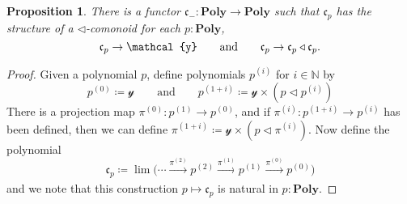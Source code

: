 \documentclass[11pt, one side, article]{memoir}
\theoremstyle{definition}
\theoremstyle{plain}
\newtheorem{proposition}[definitionx]{Proposition}
\newcommand{\Cat}[1]{\mathbf{#1}}%
\newcommand{\To}[2][]{\xrightarrow[#1]{#2}}
\newcommand{\nn}{\mathbb{N}}
\newcommand{\yon}{\mathcal{y}}
\newcommand{\poly}{\Cat{Poly}}
\newcommand{\tri}{\mathbin{\triangleleft}}
\newcommand{\cofree}{\mathfrak{c}}
\newcommand{\qqand}{\qquad\text{and}\qquad}
\newcommand{\coh}[1]{^{(#1)}}
\begin{document}
\begin{proposition}
There is a functor $\cofree_-\colon\poly\to\poly$ such that $\cofree_p$ has the structure of a $\tri$-comonoid for each $p:\poly$,
\[
\cofree_p\to\yon
\qqand
\cofree_p\to\cofree_p\tri\cofree_p.
\qedhere
\]
\end{proposition}
\begin{proof}
Given a polynomial $p$, define polynomials $p^{(i)}$ for $i\in\nn$ by
\[
  p\coh{0}\coloneqq\yon
  \qqand
  p\coh{1+i}\coloneqq\yon\times\left(p\tri p\coh{i}\right)
\]
There is a projection map $\pi\coh{0}\colon p\coh{1}\to p\coh{0}$, and if $\pi\coh{i}\colon p\coh{1+i}\to p\coh{i}$ has been defined, then we can define $\pi\coh{1+i}\coloneqq \yon\times(p\tri\pi\coh{i})$. Now define the polynomial
\begin{equation}\label{eqn.construct_cofree}
\cofree_p\coloneqq\lim\big(\cdots\To{\pi\coh{2}}p\coh{2}\To{\pi\coh{1}}p\coh{1}\To{\pi\coh{0}}p\coh{0}\big)
\end{equation}
and we note that this construction $p\mapsto \cofree_p$ is natural in $p:\poly$.


\end{proof}
\end{document}

